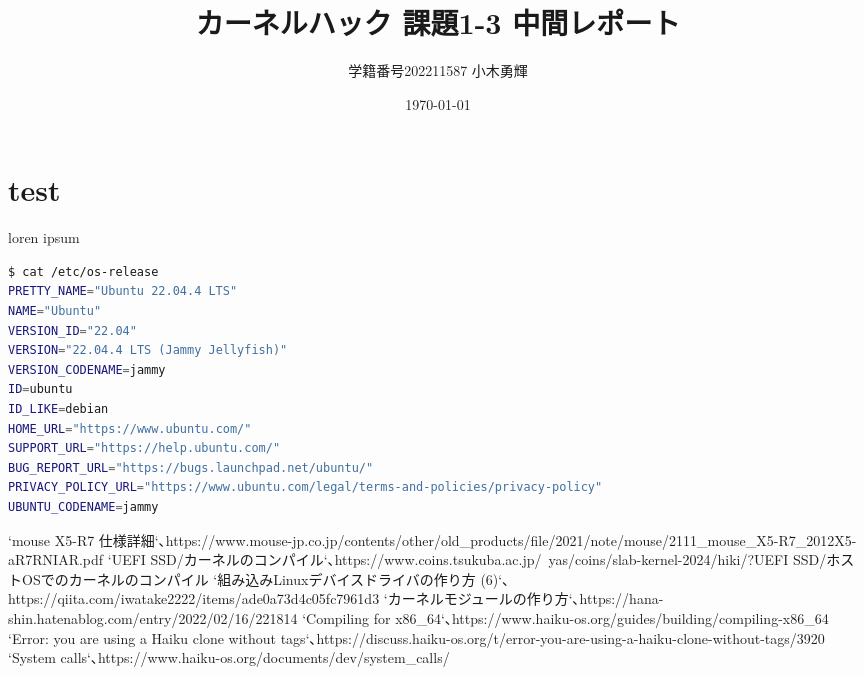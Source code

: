 \documentclass[uplatex,dvipdfmx]{ujarticle}
\begin{document}
\title{カーネルハック 課題1-3 中間レポート}
\author{学籍番号202211587 小木勇輝}
\date{\today}
\maketitle

\section{test}

loren ipsum

\begin{lstlisting}[caption=bash, label=code:fuga, language=bash]
$ cat /etc/os-release
PRETTY_NAME="Ubuntu 22.04.4 LTS"
NAME="Ubuntu"
VERSION_ID="22.04"
VERSION="22.04.4 LTS (Jammy Jellyfish)"
VERSION_CODENAME=jammy
ID=ubuntu
ID_LIKE=debian
HOME_URL="https://www.ubuntu.com/"
SUPPORT_URL="https://help.ubuntu.com/"
BUG_REPORT_URL="https://bugs.launchpad.net/ubuntu/"
PRIVACY_POLICY_URL="https://www.ubuntu.com/legal/terms-and-policies/privacy-policy"
UBUNTU_CODENAME=jammy

  \end{lstlisting}
   \begin{thebibliography}{999}
    `mouse X5-R7 仕様詳細`､https://www.mouse-jp.co.jp/contents/other/old\_products/file/2021/note/mouse/2111\_mouse\_X5-R7\_2012X5-aR7RNIAR.pdf
    `UEFI SSD/カーネルのコンパイル`､https://www.coins.tsukuba.ac.jp/~yas/coins/slab-kernel-2024/hiki/?UEFI SSD/ホストOSでのカーネルのコンパイル
     `組み込みLinuxデバイスドライバの作り方 (6)`､https://qiita.com/iwatake2222/items/ade0a73d4c05fc7961d3
     `カーネルモジュールの作り方`､https://hana-shin.hatenablog.com/entry/2022/02/16/221814
     `Compiling for x86\_64`､https://www.haiku-os.org/guides/building/compiling-x86\_64
    `Error: you are using a Haiku clone without tags`､https://discuss.haiku-os.org/t/error-you-are-using-a-haiku-clone-without-tags/3920
    `System calls`､https://www.haiku-os.org/documents/dev/system\_calls/
    \end{thebibliography}
  
\end{document}
